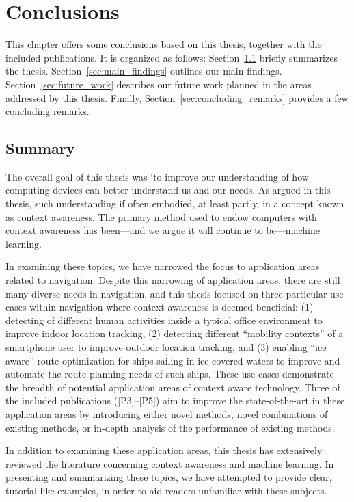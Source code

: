 \chapter{Conclusions}
\label{ch:conclusions}

This chapter offers some conclusions based on this thesis, together with the included publications. It is organized as follows: Section~\ref{sec:summary} briefly summarizes the thesis. Section~\ref{sec:main_findings} outlines our main findings. Section~\ref{sec:future_work} describes our future work planned in the areas addressed by this thesis. Finally, Section~\ref{sec:concluding_remarks} provides a few concluding remarks.

\section{Summary}
\label{sec:summary}

The overall goal of this thesis was `to improve our understanding of how computing devices can better understand us and our needs. As argued in this thesis, such understanding if often embodied, at least partly, in a concept known as context awareness. The primary method used to endow computers with context awareness has been---and we argue it will continue to be---machine learning. 

In examining these topics, we have narrowed the focus to application areas related to navigation. Despite this narrowing of application areas, there are still many diverse needs in navigation, and this thesis focused on three particular use cases within navigation where context awareness is deemed beneficial: (1) detecting of different human activities inside a typical office environment to improve indoor location tracking, (2) detecting different ``mobility contexts'' of a smartphone user to improve outdoor location tracking, and (3) enabling ``ice aware'' route optimization for ships sailing in ice-covered waters to improve and automate the route planning needs of such ships. These use cases demonstrate the breadth of potential application areas of context aware technology. Three of the included publications ([P3]--[P5]) aim to improve the state-of-the-art in these application areas by introducing either novel methods, novel combinations of existing methods, or in-depth analysis of the performance of existing methods.

In addition to examining these application areas, this thesis has extensively reviewed the literature concerning context awareness and machine learning. In presenting and summarizing these topics, we have attempted to provide clear, tutorial-like examples, in order to aid readers unfamiliar with these subjects.


